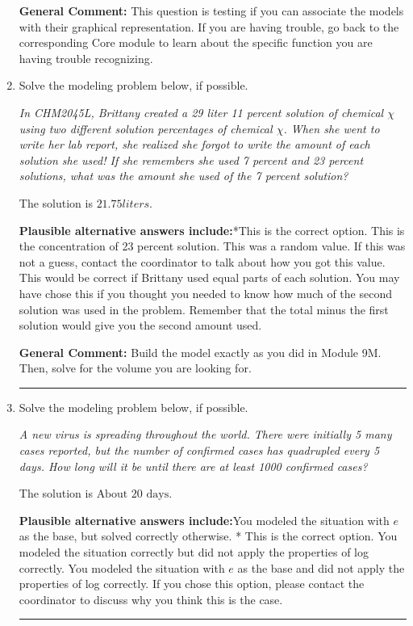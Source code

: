 \documentclass{extbook}[14pt]
\newcommand{\litem}[1]{\item #1

\rule{\textwidth}{0.4pt}}
\begin{document}
\begin{enumerate}
{\textbf{General Comment:} This question is testing if you can associate the models with their graphical representation. If you are having trouble, go back to the corresponding Core module to learn about the specific function you are having trouble recognizing.
}
\litem{
Solve the modeling problem below, if possible.

\begin{center}
    \textit{ In CHM2045L, Brittany created a 29 liter 11 percent solution of chemical $\chi$ using two different solution percentages of chemical $\chi$. When she went to write her lab report, she realized she forgot to write the amount of each solution she used! If she remembers she used 7 percent and 23 percent solutions, what was the amount she used of the 7 percent solution? }
\end{center}
The solution is \( 21.75 liters \).\begin{enumerate}[label=\Alph*.]
\textbf{Plausible alternative answers include:}*This is the correct option.
This is the concentration of 23 percent solution.
This was a random value. If this was not a guess, contact the coordinator to talk about how you got this value.
This would be correct if Brittany used equal parts of each solution.
You may have chose this if you thought you needed to know how much of the second solution was used in the problem. Remember that the total minus the first solution would give you the second amount used.
\end{enumerate}

\textbf{General Comment:} Build the model exactly as you did in Module 9M. Then, solve for the volume you are looking for.
}
\litem{
Solve the modeling problem below, if possible.

\begin{center}
    \textit{ A new virus is spreading throughout the world. There were initially 5 many cases reported, but the number of confirmed cases has quadrupled every 5 days. How long will it be until there are at least 1000 confirmed cases? }
\end{center}
The solution is \( \text{About } 20 \text{ days} \).\begin{enumerate}[label=\Alph*.]
\textbf{Plausible alternative answers include:}You modeled the situation with $e$ as the base, but solved correctly otherwise.
* This is the correct option.
You modeled the situation correctly but did not apply the properties of log correctly.
You modeled the situation with $e$ as the base and did not apply the properties of log correctly.
If you chose this option, please contact the coordinator to discuss why you think this is the case.
\end{enumerate}

}
\end{enumerate}
\end{document}
